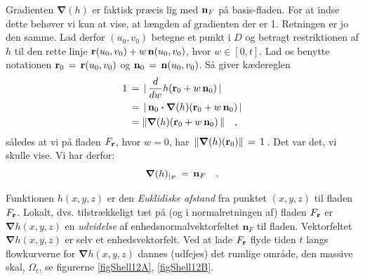 Gradienten  $\bm{\nabla}(h)$ er faktisk præcis lig med
${\bf{n}}_{F}$ på basis-fladen. For at indse
dette behøver vi kun at vise, at længden af
gradienten der er 1. Retningen er jo den samme.
Lad derfor $(u_{0},v_{0})$ betegne et punkt i $D$
og betragt restriktionen af $h$ til den rette
linje ${\bf{r}}(u_{0},v_{0}) +
w\,{\bf{n}}(u_{0},v_{0})$, hvor $w \in [0, t]$.
Lad os benytte notationen ${\bf{r}}_{0}\, = \,
{\bf{r}}(u_{0},v_{0})$ og ${\bf{n}}_{0}\, = \,
{\bf{n}}(u_{0},v_{0})$. Så giver kædereglen
\begin{equation}
\begin{aligned}
1 \, &= \, |\,\frac{d}{dw}h({\bf{r}}_{0} +
w\,{\bf{n}}_{0})\,| \,
\\ &= \, |\,{\bf{n}}_{0} \bm{\cdot} \bm{\nabla}(h)({\bf{r}}_{0} +
w\,{\bf{n}}_{0})\,| \\ &= \Vert
\bm{\nabla}(h)({\bf{r}}_{0} + w\,{\bf{n}}_{0})\,\Vert
\quad ,
\end{aligned}
\end{equation}
således at vi på fladen $F_{\bf{r}}$, hvor $w =
0$, har $\,\Vert \bm{\nabla}(h)({\bf{r}}_{0}) \Vert \,
= \, 1\,$. Det var det, vi skulle vise. Vi har derfor:
\begin{equation}
\bm{\nabla}(h)_{|_{F}} \, = \,{\bf{n}}_{F} \quad .
\end{equation}

\begin{think}
Funktionen $h(x,y,z)$ er den {\em{Euklidiske
afstand}} fra punktet $(x,y,z)$
til fladen $F_{\bf{r}}$. Lokalt, dvs. tilstrækkeligt tæt på (og i normalretningen af) fladen $F_{\bf{r}}$ er
$\bm{\nabla}h(x,y,z)$ en \emph{udvidelse} af enhedsnormalvektorfeltet $\mathbf{n}_{F}$ til fladen.
Vektorfeltet $\bm{\nabla}h(x,y,z)$ er selv et enhedsvektorfelt.
Ved at lade $F_{\bf{r}}$ flyde tiden $t$ langs flowkurverne for $\bm{\nabla}h(x,y,z)$ dannes (udfejes) det rumlige område, den massive skal, $\Omega_{t}$, se figurerne \ref{figShell12A}, \ref{figShell12B}.
\end{think}



